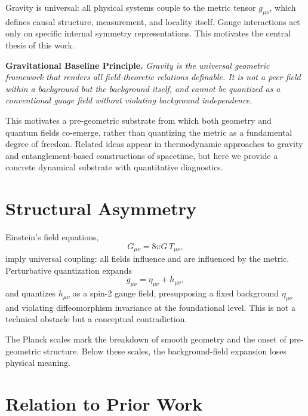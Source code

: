 \documentclass[aps,prd,twocolumn,nofootinbib,superscriptaddress]{revtex4-2}
\begin{document}
Gravity is universal: all physical systems couple to the metric tensor $g_{\mu\nu}$, which defines causal structure, measurement, and locality itself. Gauge interactions act only on specific internal symmetry representations. This motivates the central thesis of this work.

\medskip
\noindent\textbf{Gravitational Baseline Principle.}
\emph{Gravity is the universal geometric framework that renders all field-theoretic relations definable. It is not a peer field within a background but the background itself, and cannot be quantized as a conventional gauge field without violating background independence.}

\medskip

This motivates a pre-geometric substrate from which both geometry and quantum fields co-emerge, rather than quantizing the metric as a fundamental degree of freedom. Related ideas appear in thermodynamic approaches to gravity and entanglement-based constructions of spacetime, but here we provide a concrete dynamical substrate with quantitative diagnostics.

\section{Structural Asymmetry}

Einstein's field equations,
\begin{equation}
G_{\mu\nu} = 8\pi G\, T_{\mu\nu},
\end{equation}
imply universal coupling: all fields influence and are influenced by the metric. Perturbative quantization expands
\begin{equation}
g_{\mu\nu} = \eta_{\mu\nu} + h_{\mu\nu},
\end{equation}
and quantizes $h_{\mu\nu}$ as a spin-2 gauge field, presupposing a fixed background $\eta_{\mu\nu}$ and violating diffeomorphism invariance at the foundational level. This is not a technical obstacle but a conceptual contradiction.

The Planck scales mark the breakdown of smooth geometry and the onset of pre-geometric structure. Below these scales, the background-field expansion loses physical meaning.

\section{Relation to Prior Work}
\end{document}

